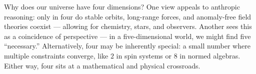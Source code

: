 \begin{commentary}
Why does our universe have four dimensions? One view appeals to anthropic reasoning: only in four do stable orbits, long-range forces, and anomaly-free field theories coexist — allowing for chemistry, stars, and observers. Another sees this as a coincidence of perspective — in a five-dimensional world, we might find five “necessary.” Alternatively, four may be inherently special: a small number where multiple constraints converge, like $2$ in spin systems or $8$ in normed algebras. Either way, four sits at a mathematical and physical crossroads.
\end{commentary}

